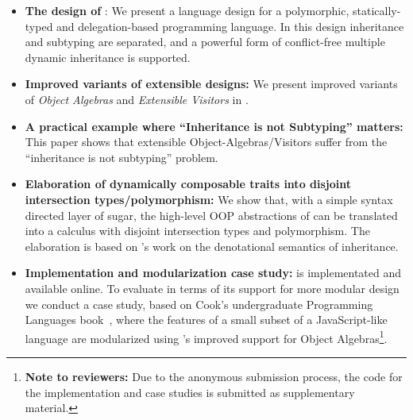 \begin{itemize}

\item {\bf The design of \name}: We present a language design for a polymorphic,
  statically-typed and delegation-based programming language. In this design
  inheritance and subtyping are separated, and a powerful form of conflict-free
  multiple dynamic inheritance is supported.

\item {\bf Improved variants of extensible designs:} We present
  improved variants of \emph{Object
    Algebras} and \emph{Extensible Visitors} in \name. 

\item {\bf A practical example where ``Inheritance is not Subtyping'' matters:}
  This paper shows that extensible Object-Algebras/Visitors suffer from the
  ``inheritance is not subtyping'' problem.

\item {\bf Elaboration of dynamically composable traits into disjoint
    intersection types/polymorphism:} We show that, with a simple syntax directed layer of
  sugar, the high-level OOP abstractions of \name can be translated into a
  calculus with disjoint intersection types and polymorphism. The elaboration is
  based on \citet{cook1989denotational}'s work on the denotational semantics of
  inheritance.

\item {\bf Implementation and modularization case study:} \name is implementated
  and available online. To evaluate \name in terms of its support for more
  modular design we conduct a case study, based on Cook's undergraduate
  Programming Languages book~\cite{poplcook}, where the features of a small
  subset of a JavaScript-like language are modularized using \name's improved
  support for Object Algebras\footnote{{\bf Note to reviewers:} Due to the
    anonymous submission process, the code for the implementation and case
    studies is submitted as supplementary material.}.

\end{itemize}

